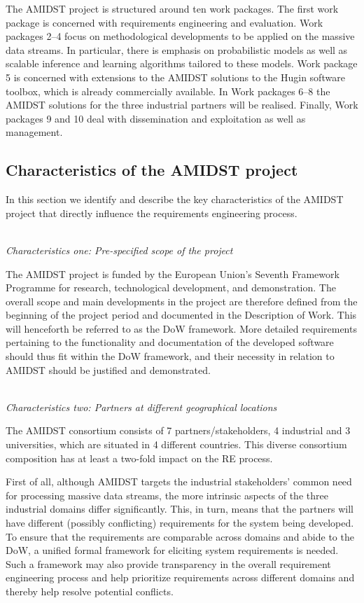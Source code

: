 The AMIDST project is structured around ten work packages. The first work package is concerned with requirements
engineering and evaluation. Work packages 2--4 focus on methodological developments to be applied on the massive data streams.  In particular, there is emphasis on probabilistic models as well as scalable inference and learning
algorithms tailored to these models. Work package 5 is concerned with extensions to the AMIDST solutions to the Hugin software toolbox, which is already commercially available.  In Work packages 6--8 the AMIDST solutions for the three industrial partners will be realised. Finally, Work packages 9 and 10 deal with dissemination and exploitation as well as management.     

\subsection{Characteristics of the AMIDST project}
\label{sec:characteristics}

In this section we identify and describe the key characteristics of the AMIDST project that directly influence the 
requirements
engineering process. 

\ \\
\noindent \emph{Characteristics one:  Pre-specified scope of the project}
\label{sec:characteristic1}

\noindent
The AMIDST project is funded by the European Union's Seventh Framework Programme for research, technological
development, and demonstration. The overall scope and main developments in the project are therefore defined from the
beginning of the project period and documented in the Description of Work. This will henceforth be referred to
as the DoW framework. More detailed requirements pertaining
to the functionality and documentation of the developed software should thus fit within the DoW framework, and their
necessity in relation to AMIDST should be justified and demonstrated.   


 

\ \\
\noindent \emph{Characteristics two: Partners at different geographical locations}
\label{sec:characteristic2}

\noindent The AMIDST consortium consists of 7 partners/stakeholders, 4 industrial and 3 universities, which are situated in 4 different
countries. This diverse consortium composition has at least a two-fold impact on the RE process.

First of
all, although AMIDST targets the industrial stakeholders' common need for processing massive data streams, the more
intrinsic aspects of the three industrial domains differ significantly. This, in turn, means that the partners will have different
(possibly conflicting) requirements for the system being developed. To ensure that the requirements are comparable
across domains and abide to the DoW, a unified formal framework for eliciting system requirements is needed. Such a
framework may also provide transparency in the overall requirement engineering process and help prioritize requirements
across different domains and thereby help resolve potential conflicts.   

